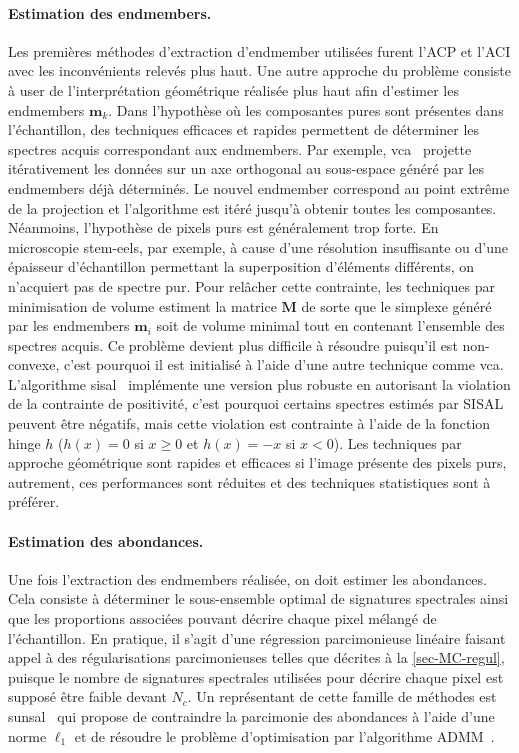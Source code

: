     \paragraph{Estimation des endmembers.} Les premières méthodes d'extraction d'endmember utilisées furent l'ACP et l'ACI avec les inconvénients relevés plus haut.
    Une autre approche du problème consiste à user de l'interprétation géométrique réalisée plus haut afin d'estimer les endmembers $\mathbf{m}_k$. Dans l'hypothèse où les composantes pures sont présentes dans l'échantillon, des techniques efficaces et rapides permettent de déterminer les spectres acquis correspondant aux endmembers. Par exemple, \gls{vca}~\cite{nascimento2005vertex} projette itérativement les données sur un axe orthogonal au sous-espace généré par les endmembers déjà déterminés. Le nouvel endmember correspond au point extrême de la projection et l'algorithme est itéré jusqu'à obtenir toutes les composantes. Néanmoins, l'hypothèse de pixels purs est généralement trop forte. En microscopie \gls{stem}-\gls{eels}, par exemple, à cause d'une résolution insuffisante ou d'une épaisseur d'échantillon permettant la superposition d'éléments différents, on n'acquiert pas de spectre pur. Pour relâcher cette contrainte, les techniques par minimisation de volume estiment la matrice $\mathbf{M}$ de sorte que le simplexe généré par les endmembers $\mathbf{m}_i$ soit de volume minimal tout en contenant l'ensemble des spectres acquis. Ce problème devient plus difficile à résoudre puisqu'il est non-convexe, c'est pourquoi il est initialisé à l'aide d'une autre technique comme \gls{vca}. L'algorithme \gls{sisal}~\cite{bioucas2009variable} implémente une version plus robuste en autorisant la violation de la contrainte de positivité, c'est pourquoi certains spectres estimés par SISAL peuvent être négatifs, mais cette violation est contrainte à l'aide de la fonction hinge $h$ ($h(x) = 0$ si $x \geq 0$ et $h(x)=-x$ si $x<0$). Les techniques par approche géométrique sont rapides et efficaces si l'image présente des pixels purs, autrement, ces performances sont réduites et des techniques statistiques sont à préférer.
    
    \paragraph{Estimation des abondances.} Une fois l'extraction des endmembers réalisée, on doit estimer les abondances.  Cela consiste à déterminer le sous-ensemble optimal de signatures spectrales ainsi que les proportions associées pouvant décrire chaque pixel mélangé de l'échantillon. En pratique, il s'agit d'une régression parcimonieuse linéaire faisant appel à des régularisations parcimonieuses telles que décrites à la \cref{sec-MC-regul}, puisque le nombre de signatures spectrales utilisées pour décrire chaque pixel est supposé être faible devant $N_c$. Un représentant de cette famille de méthodes est \gls{sunsal}~\cite{bioucas2010alternating} qui propose de contraindre la parcimonie des abondances à l'aide d'une norme $\ell_1$ et de résoudre le problème d'optimisation par l'algorithme ADMM~\cite{eckstein1992douglas, combettes2011proximal}.
    
